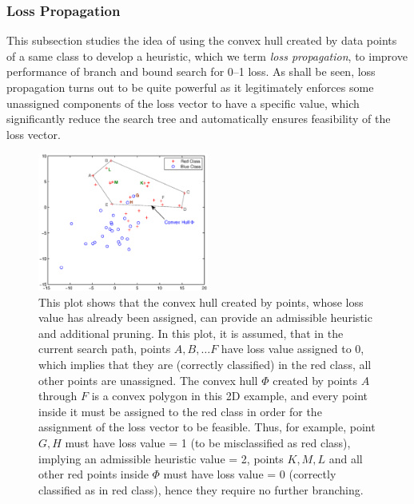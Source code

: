 \subsubsection{Loss Propagation}
\label{sec:bnb.heuristic}

This subsection studies the idea of using the convex hull created by
data points of a same class to develop a heuristic, which we term
\emph{loss propagation}, to improve performance of branch and bound
search for 0--1 loss. As shall be seen, loss propagation turns out to
be quite powerful as it legitimately enforces some unassigned
components of the loss vector to have a specific value, which
significantly reduce the search tree and automatically ensures
feasibility of the loss vector.

\begin{figure}[here]
\includegraphics[width=0.50\textwidth]{images/fig32_convexhull.eps}
\caption{ This plot shows that the convex hull created by points,
  whose loss value has already been assigned, can provide an
  admissible heuristic and additional pruning.  In this plot, it is
  assumed, that in the current search path, points $A, B, \dots F$
  have loss value assigned to 0, which implies that they are
  (correctly classified) in the red class, all other points are
  unassigned. The convex hull $\Phi$ created by points $A$ through $F$
  is a convex polygon in this 2D example, and every point inside it
  must be assigned to the red class in order for the assignment of the
  loss vector to be feasible. Thus, for example, point $G, H$ must
  have loss value = 1 (to be misclassified as red class), implying an
  admissible heuristic value = 2, points $K, M, L$ and all other red
  points inside $\Phi$ must have loss value = 0 (correctly classified
  as in red class), hence they require no further branching.  }
\label{fig:convexhull}
\end{figure} 


